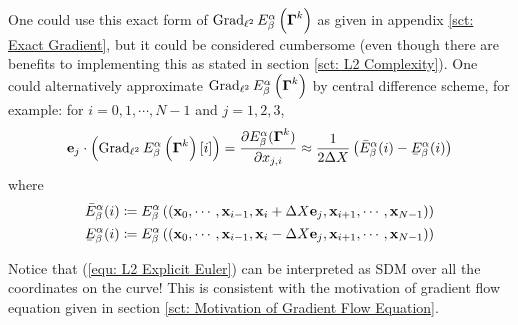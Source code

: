 \documentclass[../dissertation.tex]{subfiles}
\begin{document}
One could use this exact form of $\operatorname{Grad}_{\ell^2} E_{\beta}^{\alpha} \left( \boldsymbol{\Gamma}^k \right)$ as given in appendix \ref{sct: Exact Gradient}, but it could be considered cumbersome (even though there are benefits to implementing this as stated in section \ref{sct: L2 Complexity}).
One could alternatively approximate $\operatorname{Grad}_{\ell^2} E_{\beta}^{\alpha} \left( \boldsymbol{\Gamma}^k \right)$ by central difference scheme, for example:
for $i=0,1,\cdots,N-1$ and $j = 1,2,3$,
\begin{equation}
    \ebf_j \cdot \left( \Grad_{\ell^2} E_{\beta}^{\alpha} \left( \Gammabf^k \right) [i] \right)
    =
    \frac{\partial E_{\beta}^{\alpha} (\Gammabf^k)}{\partial x_{j,i}}
    \approx
    \frac{1}{2 \Delta X} \left( 
        \bar{E}_{\beta}^{\alpha} (i)
        -
        \underaccent{\bar} E_{\beta}^{\alpha} (i)
    \right)
\end{equation}
where
\begin{align*}
    \bar{E}_{\beta}^{\alpha} (i) &\coloneqq E_{\beta}^{\alpha} \left( \left( \xbf_0, \cdots, \xbf_{i-1}, \xbf_i + \Delta X \ebf_{j}, \xbf_{i+1}, \cdots, \xbf_{N-1}\right) \right) \\
    \underaccent{\bar}{E}_{\beta}^{\alpha} (i) &\coloneqq E_{\beta}^{\alpha} \left( \left( \xbf_0, \cdots, \xbf_{i-1}, \xbf_i - \Delta X \ebf_{j}, \xbf_{i+1}, \cdots, \xbf_{N-1}\right) \right)
\end{align*}


\begin{remark}
Notice that (\ref{equ: L2 Explicit Euler}) can be interpreted as SDM over all the coordinates on the curve!
This is consistent with the motivation of gradient flow equation given in section \ref{sct: Motivation of Gradient Flow Equation}.
\end{remark}
\end{document}
